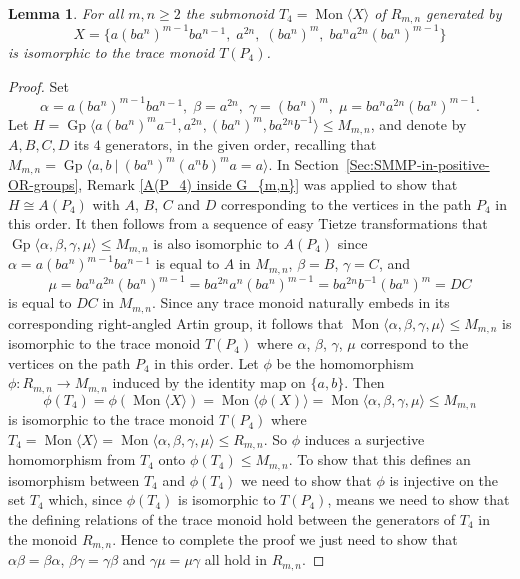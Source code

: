 \documentclass{amsart}
\newcommand{\Mgen}[1]{\operatorname{Mon}\bigl\langle #1 \bigr\rangle}
\newcommand{\Ggen}[1]{\operatorname{Gp}\bigl\langle #1 \bigr\rangle}
\newcommand{\Gpres}[2]{\operatorname{Gp}\bigl\langle #1\:|\:#2 \bigr\rangle}
\newcommand{\M}{R_{m,n}}
\theoremstyle{plain}
\newtheorem{lemma}[theorem]{Lemma}
\theoremstyle{definition}
\begin{document}
\begin{lemma}\label{lemma: copy of A(P4)}
For all $m, n \geq 2$ the submonoid $T_4 = \Mgen{X}$ of $\M$ generated by
\[
X =  
\{ 
a(ba^n)^{m-1} b a^{n-1}, \;
a^{2n},  \;
(ba^n)^m,  \;
ba^n a^{2n} (ba^n)^{m-1}
\} 
\]
is isomorphic to the trace monoid $T(P_4)$.
\end{lemma}
\begin{proof}
Set 
\[
\alpha
=a(ba^n)^{m-1} b a^{n-1}, \;
\beta
=a^{2n},  \;
\gamma
=(ba^n)^m,  \;
\mu
=ba^n a^{2n} (ba^n)^{m-1}.
\]
Let $H = \Ggen{a(ba^n)^ma^{-1}, a^{2n}, (ba^n)^m, ba^{2n}b^{-1}} \leqslant M_{m,n}$, 
and denote by $A, B, C, D$ its $4$ generators, in the given order,  
recalling that $M_{m,n} = \Gpres{a, b}{(b a^n)^m(a^n b)^ma = a}$. In Section~\ref{Sec:SMMP-in-positive-OR-groups}, Remark \ref{A(P_4) inside G_{m,n}} was applied to show that $H \cong A(P_4)$ with $A$, $B$, $C$ and $D$ corresponding to the vertices in the path $P_4$ in this order. It then follows from a sequence of easy Tietze transformations that $\Ggen{\alpha,\beta,\gamma,\mu} \leq M_{m,n}$ is also isomorphic to $A(P_4)$ 
since $\alpha = a(ba^n)^{m-1} b a^{n-1}$ is equal to $A$ in $M_{m,n}$,
$\beta = B$, $\gamma = C$,   
and    
\[
\mu = ba^n a^{2n} (ba^n)^{m-1} = ba^{2n}a^n (ba^n)^{m-1} = ba^{2n}b^{-1}(ba^n)^m  = DC
\]
is equal to $DC$ in $M_{m,n}$. Since any trace monoid naturally embeds in its corresponding right-angled Artin group, it follows that 
$\Mgen{\alpha,\beta,\gamma,\mu} \leq M_{m,n}$ is isomorphic to the trace monoid $T(P_4)$ where $\alpha$, $\beta$, $\gamma$, $\mu$ correspond to the vertices on the path $P_4$ in this order.  
Let $\phi$ be the homomorphism $\phi: R_{m,n} \rightarrow M_{m,n}$ induced by the identity map on $\{a,b\}$. 
Then 
\[
\phi(T_4) = \phi(\Mgen{X}) = \Mgen{\phi(X)} =  \Mgen{\alpha,\beta,\gamma,\mu} \leq M_{m,n}
\]
is isomorphic to the trace monoid $T(P_4)$ where $T_4 = \Mgen{X} = \Mgen{\alpha,\beta,\gamma,\mu} \leq R_{m,n}$. So $\phi$ induces a surjective homomorphism from $T_4$ onto $\phi(T_4) \leq M_{m,n}$. To show that this defines an isomorphism between $T_4$ and $\phi(T_4)$ we need to show that $\phi$ is injective on the set $T_4$ which, since $\phi(T_4)$ is isomorphic to $T(P_4)$, means we need to show that the defining relations of the trace monoid hold between the generators of $T_4$ in the monoid $R_{m,n}$. Hence to complete the proof we just need to show that $\alpha \beta = \beta \alpha$, $\beta \gamma = \gamma \beta$ and $\gamma \mu = \mu \gamma$ all hold in $R_{m,n}$.


\end{proof}
\end{document}

